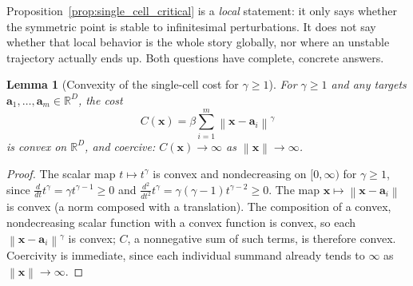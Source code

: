 \documentclass[11pt,a4paper]{article}
\theoremstyle{plain}
\newtheorem{lemma}[theorem]{Lemma}
\theoremstyle{definition}
\theoremstyle{remark}
\newcommand{\bx}{\bm{x}}
\newcommand{\ba}{\bm{a}}
\newcommand{\R}{\mathbb{R}}
\newcommand{\norm}[1]{\left\lVert #1\right\rVert}
\newcommand{\bw}{\beta}
\begin{document}
Proposition~\ref{prop:single_cell_critical} is a \emph{local} statement: it
only says whether the symmetric point is stable to infinitesimal
perturbations. It does not say whether that local behavior is the whole
story globally, nor where an unstable trajectory actually ends up. Both
questions have complete, concrete answers.

\begin{lemma}[Convexity of the single-cell cost for $\gamma\ge1$]
\label{lem:cost_convex}
For $\gamma\ge1$ and any targets $\ba_1,\ldots,\ba_m\in\R^D$, the cost
\begin{equation}
  \boxed{
  C(\bx)=\bw\sum_{i=1}^{m}\norm{\bx-\ba_i}^{\gamma}
  }
  \label{eq:cost_def}
\end{equation}
is convex on $\R^D$, and coercive: $C(\bx)\to\infty$ as $\norm{\bx}\to\infty$.
\end{lemma}
\begin{proof}
The scalar map $t\mapsto t^{\gamma}$ is convex and nondecreasing on
$[0,\infty)$ for $\gamma\ge1$, since $\frac{d}{dt}t^\gamma=\gamma
t^{\gamma-1}\ge0$ and $\frac{d^2}{dt^2}t^\gamma=\gamma(\gamma-1)t^{\gamma-2}\ge0$.
The map $\bx\mapsto\norm{\bx-\ba_i}$ is convex (a norm composed with a
translation). The composition of a convex, nondecreasing scalar function
with a convex function is convex, so each $\norm{\bx-\ba_i}^\gamma$ is
convex; $C$, a nonnegative sum of such terms, is therefore convex.
Coercivity is immediate, since each individual summand already tends to
$\infty$ as $\norm{\bx}\to\infty$.
\end{proof}
\end{document}

